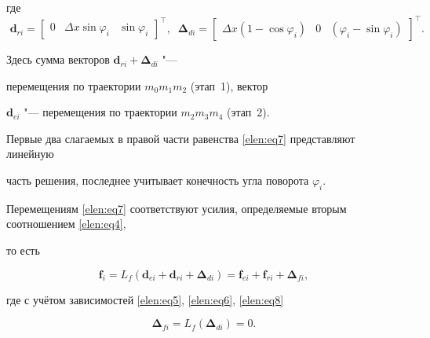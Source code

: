 где \begin{equation}

\label{elen:eq8}

\textbf{ d}_{ri}{ =}\begin{bmatrix}

 0  & \Delta x \sin \varphi_i  & \sin \varphi_i

\end{bmatrix}^\top,

\; \;

\mathbf{ \Delta }_{di}{ =}\begin{bmatrix}

\Delta x(1-\cos \varphi _i ) & 0 & (\varphi _i -\sin

\varphi _i)

\end{bmatrix}^\top.

\end{equation}

Здесь сумма векторов $\textbf{d}_{ri}+\mathbf{\Delta}_{di}$ "---

перемещения по траектории $m_0m_1m_2$ \linebreak (этап~1), вектор

$\textbf{d}_{ei}$ "--- перемещения по траектории $m_2m_3m_4$ (этап~2).

Первые два слагаемых в правой части равенства \eqref{elen:eq7} представляют линейную

часть решения, последнее учитывает конечность угла поворота $\varphi_{i}$.



Перемещениям \eqref{elen:eq7} соответствуют усилия, определяемые вторым соотношением \eqref{elen:eq4},

то есть

\begin{equation}

\label{elen:eq9}

\textbf{f}_i =L_f \left(\textbf{d}_{ei} +\textbf{d}_{ri} +\mathbf{\Delta}_{di} \right)=\textbf {f}_{ei} +

\textbf{f}_{ri} +\mathbf{\Delta}_{fi},

\end{equation}

где с учётом зависимостей \eqref{elen:eq5}, \eqref{elen:eq6}, \eqref{elen:eq8}

\begin{equation}

\label{elen:eq10}

\mathbf{\Delta}_{fi} =L_f \left(\mathbf{\Delta}_{di}\right)=0.

\end{equation}



